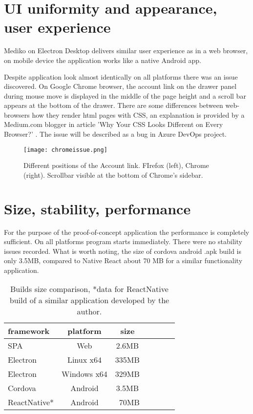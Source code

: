 \section{{UI uniformity and appearance, user experience}}%
\label{sec:appseveluation}
Mediko on Electron Desktop delivers similar user experience as in a web browser, on mobile device the application works like a native Android app.

Despite application look almost identically on all platforms there was an issue discovered. On Google Chrome browser, the account link on the drawer panel during mouse move is displayed in the middle of the page height and a scroll bar appears at the bottom of the drawer. There are some differences between web-browsers how they render html pages with CSS, an explanation is provided by a Medium.com blogger in article 'Why Your CSS Looks Different on Every Browser?' \autocite{MediumCSS}. The issue will be described as a bug in Azure DevOps project.

\begin{figure}[H]
    \centering
    \texttt{[image: chromeissue.png]}
    \caption[CSS rendering issue]{\label{fig:chromeissue} Different positions of the Account link. FIrefox (left), Chrome (right). Scrollbar visible at the bottom of Chrome's sidebar.}
\end{figure}

\section{{Size, stability, performance}}%
\label{sec:sizeapps}
For the purpose of the proof-of-concept application the performance is completely sufficient. On all platforms program starts immediately. There were no stability issues recorded. What is worth noting, the size of cordova android .apk build is only 3.5MB, compared to Native React about 70 MB for a similar functionality application.

\begin{table}[H]
    \centering
    \begin{tabular}{lcccccc}
        \toprule
        framework & platform & size \\
        \midrule
        SPA  &  Web  &  2.6MB   \\
        Electron  &  Linux x64  &  335MB   \\
        Electron  &  Windows x64  &  329MB   \\
        Cordova  &  Android  &  3.5MB   \\
        ReactNative*  &  Android  &  ~70MB   \\

 
        \bottomrule
\end{tabular}
\caption[Builds size comparison]{\label{tab:builds_size}Builds size comparison, *data for ReactNative build of a similar application developed by the author.
}
\end{table}

